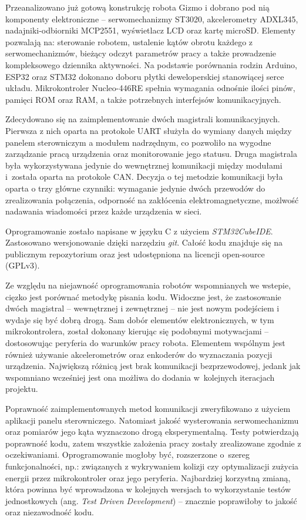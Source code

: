 Przeanalizowano już gotową konstrukcję robota Gizmo i dobrano pod nią komponenty elektroniczne -- serwomechanizmy ST3020, akcelerometry ADXL345, nadajniki-odbiorniki MCP2551, wyświetlacz LCD oraz kartę microSD. Elementy pozwalają na: sterowanie robotem, ustalenie kątów obrotu każdego z serwomechanizmów, bieżący odczyt parametrów pracy a także prowadzenie kompleksowego dziennika aktywności. Na podstawie porównania rodzin Arduino, ESP32 oraz STM32 dokonano doboru płytki deweloperskiej stanowiącej serce układu. Mikrokontroler Nucleo-446RE spełnia wymagania odnośnie ilości pinów, pamięci ROM oraz RAM, a także potrzebnych interfejsów komunikacyjnych.

Zdecydowano się na zaimplementowanie dwóch magistrali komunikacyjnych. Pierwsza z nich oparta na protokole UART służyła do wymiany danych między panelem sterowniczym a modułem nadrzędnym, co pozwoliło na wygodne zarządzanie pracą urządzenia oraz monitorowanie jego statusu. Druga magistrala była wykorzystywana jedynie do wewnętrznej komunikacji między modułami i~została oparta na protokole CAN. Decyzja o tej metodzie komunikacji była oparta o trzy główne czynniki: wymaganie jedynie dwóch przewodów do zrealizowania połączenia, odporność na zakłócenia elektromagnetyczne, możlwość nadawania wiadomości przez każde urządzenia w sieci. 

Oprogramowanie zostało napisane w języku C z użyciem \textit{STM32CubeIDE}. Zastosowano wersjonowanie dzięki narzędziu \textit{git}. Całość kodu znajduje się na publicznym repozytorium oraz jest udostępniona na licencji open-source (GPLv3).

Ze względu na niejawność oprogramowania robotów wspomnianych we wstepie, cięzko jest porównać metodykę pisania kodu. Widoczne jest, że zastosowanie dwóch magistral -- wewnętrznej i zewnętrznej -- nie jest nowym podejściem i wydaje się być dobrą drogą. Sam dobór elementów elektronicznych, w tym mikrokontrolera, został dokonany kierując się podobnymi motywacjami -- dostosowując peryferia do warunków pracy robota. Elementem wspólnym jest również używanie akcelerometrów oraz enkoderów do wyznaczania pozycji urządzenia. Największą różnicą jest brak komunikacji bezprzewodowej, jedank jak wspomniano wcześniej jest ona możliwa do dodania w~kolejnych iteracjach projektu. 

Poprawność zaimplementowanych metod komunikacji zweryfikowano z użyciem aplikacji panelu sterowniczego. Natomiast jakość wysterowania serwomechanizmu oraz pomiarów jego kąta wyznaczono drogą eksperymentalną. Testy potwierdzają poprawność kodu, zatem wszystkie założenia pracy zostały zrealizowane zgodnie z oczekiwaniami. Oprogramowanie mogłoby być, rozszerzone o~szereg funkcjonalności, np.: związanych z wykrywaniem kolizji czy optymalizacji zużycia energii przez mikrokontroler oraz jego peryferia. Najbardziej korzystną zmianą, która powinna być wprowadzona w kolejnych wersjach to wykorzystanie testów jednostkowych (ang. \textit{Test Driven Development}) -- znacznie poprawiłoby to jakość oraz niezawodność kodu.

